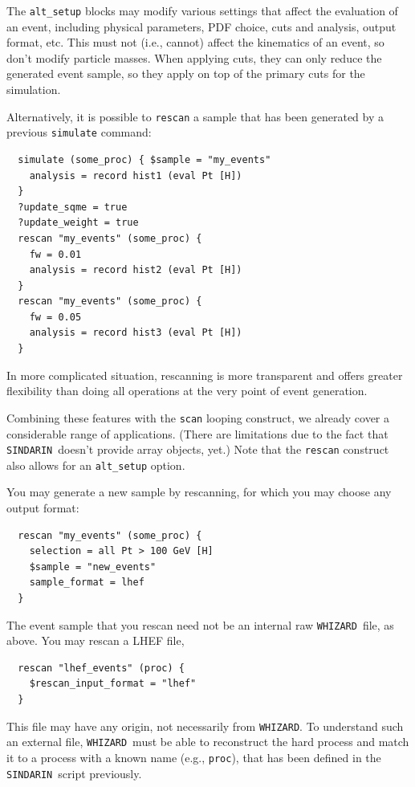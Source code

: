\documentclass[12pt]{book}
\newcommand{\ttt}[1]{\texttt{#1}}
\newcommand{\whizard}{\ttt{WHIZARD}}
\newcommand{\sindarin}{\ttt{SINDARIN}}
\begin{document}
The \ttt{alt\_setup} blocks may modify various settings that affect the
evaluation of an event, including physical parameters, PDF choice,
cuts and analysis, output format, etc.  This must not (i.e., cannot)
affect the kinematics of an event, so don't modify particle masses.
When applying cuts, they can only reduce the generated event sample,
so they apply on top of the primary cuts for the simulation.

Alternatively, it is possible to \ttt{rescan} a sample that has been
generated by a previous \ttt{simulate} command:
\begin{footnotesize}
\begin{verbatim}
  simulate (some_proc) { $sample = "my_events"
    analysis = record hist1 (eval Pt [H])
  }
  ?update_sqme = true
  ?update_weight = true
  rescan "my_events" (some_proc) {
    fw = 0.01
    analysis = record hist2 (eval Pt [H])
  }
  rescan "my_events" (some_proc) {
    fw = 0.05
    analysis = record hist3 (eval Pt [H])
  }
\end{verbatim}
\end{footnotesize}
In more complicated situation, rescanning is more transparent and
offers greater flexibility than doing all operations at the very point
of event generation.

Combining these features with the \ttt{scan} looping construct, we
already cover a considerable range of applications.  (There are
limitations due to the fact that \sindarin\ doesn't provide array
objects, yet.)  Note that the \ttt{rescan} construct also allows
for an \ttt{alt\_setup} option.

You may generate a new sample by rescanning, for which you may choose
any output format:
\begin{footnotesize}
\begin{verbatim}
  rescan "my_events" (some_proc) {
    selection = all Pt > 100 GeV [H]
    $sample = "new_events"
    sample_format = lhef
  }
\end{verbatim}
\end{footnotesize}

The event sample that you rescan need not be an internal raw \whizard\
file, as above.  You may rescan a LHEF file,
\begin{footnotesize}
\begin{verbatim}
  rescan "lhef_events" (proc) {
    $rescan_input_format = "lhef"
  }
\end{verbatim}
\end{footnotesize}
This file may have any origin, not necessarily from \whizard.  To
understand such an external file, \whizard\ must be able to
reconstruct the hard process and match it to a process with a known
name (e.g., \ttt{proc}), that has been defined in the \sindarin\ script
previously.
\end{document}
